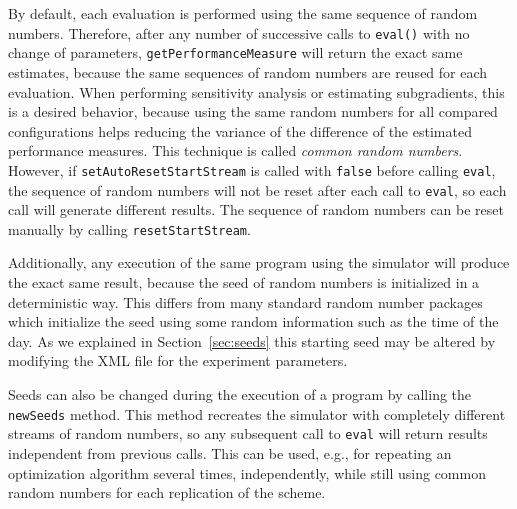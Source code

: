 By default, each evaluation is performed using the same sequence of
random numbers.  Therefore, after any number of successive calls
to \texttt{eval()} with no change of parameters,
\texttt{get\-Performance\-Measure}
will return the exact same estimates, because the same sequences of
random numbers are reused for each evaluation.
When performing sensitivity analysis or estimating subgradients, this is
a desired behavior, because using the same random numbers for all
compared configurations helps reducing the variance of the difference
of the estimated performance measures.
This technique is called \emph{common random numbers}.
However, if \texttt{set\-Auto\-Reset\-Start\-Stream} is called with
\texttt{false} before calling \texttt{eval}, the sequence of random
numbers will not be reset after each call to \texttt{eval}, so each
call will generate different results.
The sequence of random numbers can be reset manually by calling
\texttt{reset\-Start\-Stream}.

Additionally, any execution of the same program using the simulator
will produce the exact same result, because the seed of random numbers
is initialized in a deterministic way.  This differs
from many standard
random number packages which initialize the seed using some random
information such as the time of the day.
As we explained in Section~\ref{sec:seeds}
this starting seed may be altered by modifying the XML file for the
experiment parameters.

Seeds can also be changed during the execution of a program by calling
the \texttt{new\-Seeds} method.
This method recreates the simulator with completely different streams
of random numbers, so any subsequent call to
\texttt{eval} will return results independent from previous calls.
This can be used, e.g., for repeating an optimization algorithm
several times, independently, while still using common random numbers
for each replication of the scheme.


